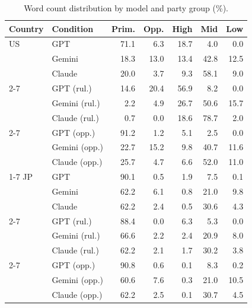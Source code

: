 \begin{table}[t]
\centering
\footnotesize
\setlength{\tabcolsep}{3pt}
\caption{Word count distribution by model and party group (\%).}
\label{tab:wc-values}
\begin{tabular}{llrrrrr}
\toprule
\textbf{Country} & \textbf{Condition} & \textbf{Prim.} & \textbf{Opp.} & \textbf{High} & \textbf{Mid} & \textbf{Low} \\
\midrule
US & GPT & 71.1 & 6.3 & 18.7 & 4.0 & 0.0 \\
 & Gemini & 18.3 & 13.0 & 13.4 & 42.8 & 12.5 \\
 & Claude & 20.0 & 3.7 & 9.3 & 58.1 & 9.0 \\
\cmidrule(lr){2-7}
 & GPT (rul.) & 14.6 & 20.4 & 56.9 & 8.2 & 0.0 \\
 & Gemini (rul.) & 2.2 & 4.9 & 26.7 & 50.6 & 15.7 \\
 & Claude (rul.) & 0.7 & 0.0 & 18.6 & 78.7 & 2.0 \\
\cmidrule(lr){2-7}
 & GPT (opp.) & 91.2 & 1.2 & 5.1 & 2.5 & 0.0 \\
 & Gemini (opp.) & 22.7 & 15.2 & 9.8 & 40.7 & 11.6 \\
 & Claude (opp.) & 25.7 & 4.7 & 6.6 & 52.0 & 11.0 \\
\cmidrule(lr){1-7}
JP & GPT & 90.1 & 0.5 & 1.9 & 7.5 & 0.1 \\
 & Gemini & 62.2 & 6.1 & 0.8 & 21.0 & 9.8 \\
 & Claude & 62.2 & 2.4 & 0.5 & 30.6 & 4.3 \\
\cmidrule(lr){2-7}
 & GPT (rul.) & 88.4 & 0.0 & 6.3 & 5.3 & 0.0 \\
 & Gemini (rul.) & 66.6 & 2.2 & 2.4 & 20.9 & 8.0 \\
 & Claude (rul.) & 62.2 & 2.1 & 1.7 & 30.2 & 3.8 \\
\cmidrule(lr){2-7}
 & GPT (opp.) & 90.8 & 0.6 & 0.1 & 8.3 & 0.2 \\
 & Gemini (opp.) & 60.6 & 7.6 & 0.3 & 21.0 & 10.5 \\
 & Claude (opp.) & 62.2 & 2.5 & 0.1 & 30.7 & 4.5 \\
\bottomrule
\end{tabular}
\end{table}
